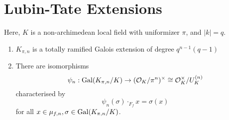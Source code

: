 \documentclass[10pt,a4paper]{article}
\begin{document}
\section{Lubin-Tate Extensions}
Here, $K$ is a non-archimedean local field with uniformizer $\pi$, and $|k|=q$.
\begin{theorem}\hspace*{0cm}
  \begin{enumerate}
    \item $K_{\pi, n}$ is a totally ramified Galois extension of degree $q^{n-1}(q-1)$

    \item There are isomorphisms
    \[\psi_n: \operatorname{Gal}(K_{\pi,n}/K) \to (\mathcal{O}_K/\pi^n)^\times \cong \mathcal{O}_K^\times/U_K^{(n)}\]
    characterised by
    \[\psi_n(\sigma)\cdot_{F_f} x = \sigma(x)\]
    for all $x \in \mu_{f,n}, \sigma \in \operatorname{Gal}(K_{\pi,n}/K)$.
  \end{enumerate}
\end{theorem}
\end{document}
